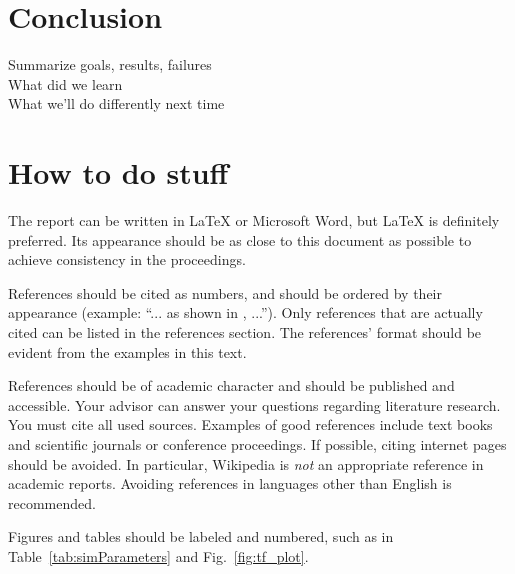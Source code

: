 \documentclass[journal, a4paper]{IEEEtran}
\begin{document}
\section{Conclusion}
Summarize goals, results, failures \\
What did we learn \\ 
What we’ll do differently next time \\

\section{How to do stuff}
    The report can be written in \LaTeX{} or Microsoft Word, but \LaTeX{} is definitely preferred.
    Its appearance should be as close to this document as possible to achieve consistency in the proceedings.

    References should be cited as numbers, and should be ordered by their appearance (example: ``... as shown in , ...'').
    Only references that are actually cited can be listed in the references section.
    The references' format should be evident from the examples in this text.

    References should be of academic character and should be published and accessible.
    Your advisor can answer your questions regarding literature research.
    You must cite all used sources.
    Examples of good references include text books and scientific journals or conference proceedings.
    If possible, citing internet pages should be avoided. In particular, Wikipedia is \emph{not} an appropriate reference in academic reports.
    Avoiding references in languages other than English is recommended.

    Figures and tables should be labeled and numbered, such as in Table~\ref{tab:simParameters} and Fig.~\ref{fig:tf_plot}.
\end{document}
